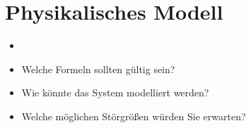 \section{Physikalisches Modell}
\label{sec:Physikalisches Modell}

\begin{itemize}
    \item 
    \item Welche Formeln sollten gültig sein?
    \item Wie könnte das System modelliert werden?
    \item Welche möglichen Störgrößen würden Sie erwarten?
\end{itemize}

